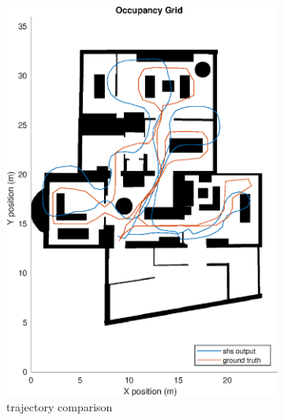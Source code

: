 \begin{figure}[H]
	\centering
	\begin{subfigure}[t]{.45\textwidth}
		\centering
		\includegraphics[width=0.9\linewidth]{images/20201029_1040_trial1_shs_1}
		\caption{trajectory comparison}
		\label{fig:trial1_on_map}
	\end{subfigure}
	\begin{subfigure}[t]{.45\textwidth}
		\centering

\end{subfigure}
\end{figure}
